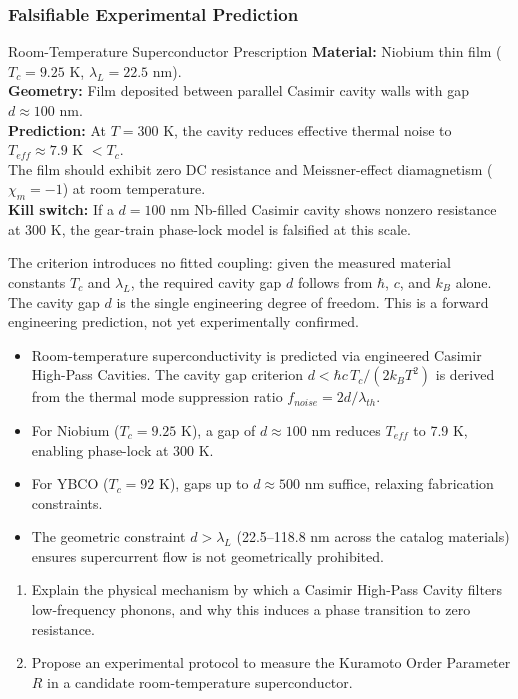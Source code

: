 \subsubsection{Falsifiable Experimental Prediction}

\begin{resultbox}{Room-Temperature Superconductor Prescription}
\textbf{Material:} Niobium thin film ($T_c = 9.25$ K, $\lambda_L = 22.5$ nm). \\
\textbf{Geometry:} Film deposited between parallel Casimir cavity walls with gap $d \approx 100$ nm. \\
\textbf{Prediction:} At $T = 300$ K, the cavity reduces effective thermal noise to $T_{eff} \approx 7.9$ K $< T_c$. \\
The film should exhibit zero DC resistance and Meissner-effect diamagnetism ($\chi_m = -1$) at room temperature. \\[6pt]
\textbf{Kill switch:} If a $d = 100$ nm Nb-filled Casimir cavity shows nonzero resistance at 300 K, the gear-train phase-lock model is falsified at this scale.
\end{resultbox}

\noindent The criterion introduces no fitted coupling: given the measured material constants $T_c$ and $\lambda_L$, the required cavity gap $d$ follows from $\hbar$, $c$, and $k_B$ alone. The cavity gap $d$ is the single engineering degree of freedom. This is a forward engineering prediction, not yet experimentally confirmed.

\begin{summarybox}
\begin{itemize}
    \item Room-temperature superconductivity is predicted via engineered Casimir High-Pass Cavities. The cavity gap criterion $d < \hbar c \, T_c / (2 k_B T^2)$ is derived from the thermal mode suppression ratio $f_{noise} = 2d/\lambda_{th}$.
    \item For Niobium ($T_c = 9.25$ K), a gap of $d \approx 100$ nm reduces $T_{eff}$ to 7.9 K, enabling phase-lock at 300 K.
    \item For YBCO ($T_c = 92$ K), gaps up to $d \approx 500$ nm suffice, relaxing fabrication constraints.
    \item The geometric constraint $d > \lambda_L$ (22.5--118.8 nm across the catalog materials) ensures supercurrent flow is not geometrically prohibited.
\end{itemize}
\end{summarybox}

\begin{exercisebox}
\begin{enumerate}
    \item Explain the physical mechanism by which a Casimir High-Pass Cavity filters low-frequency phonons, and why this induces a phase transition to zero resistance.
    \item Propose an experimental protocol to measure the Kuramoto Order Parameter $R$ in a candidate room-temperature superconductor.
\end{enumerate}
\end{exercisebox}

